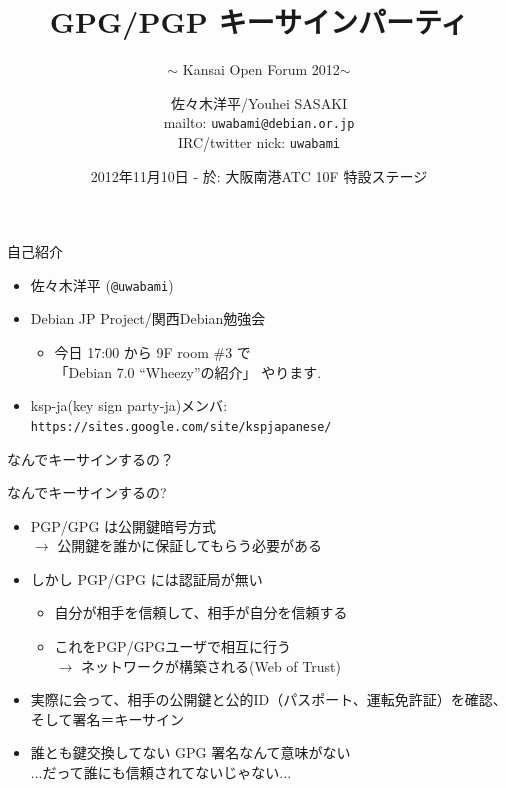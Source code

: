 \documentclass[cjk,dvipdfmx,12pt,compress]{beamer}
\title{GPG/PGP キーサインパーティ}
\subtitle{$\sim$ Kansai Open Forum 2012$\sim$}
\author{%
  佐々木洋平/Youhei SASAKI \\%
  \footnotesize{%
    mailto: \texttt{uwabami@debian.or.jp} \\%
    IRC/twitter nick: \texttt{uwabami}}}
\institute{%
  {\footnotesize{keysignparty-ja/Debian JP Project/関西Debian勉強会}}}
\date{%
  {\footnotesize{2012年11月10日 - 於: 大阪南港ATC 10F 特設ステージ}}}
\begin{document}
\frame{\titlepage{}}

\begin{frame}{自己紹介}
\begin{itemize}[<+->]

\item 佐々木洋平 (\texttt{@uwabami})
\item Debian JP Project/関西Debian勉強会
  \begin{itemize}
  \item 今日 17:00 から 9F room \#3 で\\
    「Debian 7.0 ``Wheezy''の紹介」 やります.
  \end{itemize}
\item \alert{ksp-ja(key sign party-ja)メンバ}:\\
  \texttt{https://sites.google.com/site/kspjapanese/}
\end{itemize}
\end{frame}

\begin{frame}
\begin{center}
  \huge{なんでキーサインするの？}
\end{center}
\end{frame}

\begin{frame}{なんでキーサインするの?}
  \begin{itemize}[<+->]
  \item PGP/GPG は公開鍵暗号方式
    \\ $\rightarrow$ 公開鍵を誰かに保証してもらう必要がある
  \item しかし PGP/GPG には認証局が無い
    \begin{itemize}
    \item 自分が相手を信頼して、相手が自分を信頼する
    \item これをPGP/GPGユーザで相互に行う
      \\ $\rightarrow$ ネットワークが構築される(\alert{Web of Trust})
    \end{itemize}
  \item 実際に会って、相手の公開鍵と公的ID（パスポート、運転免許証）を確認、そして署名＝キーサイン
  \item 誰とも鍵交換してない GPG 署名なんて意味がない
    \\ ...だって誰にも信頼されてないじゃない...
  \end{itemize}
\end{frame}
\end{document}
